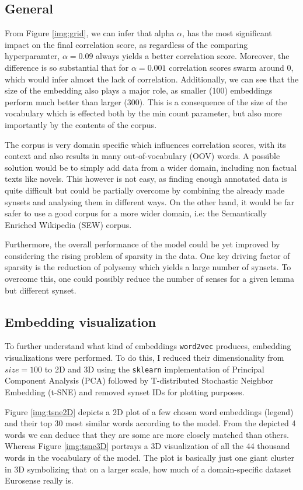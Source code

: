 \documentclass[12pt,a4paper]{article}
\begin{document}
\subsection{General}
From Figure \ref{img:grid}, we can infer that alpha $\alpha$, has the most significant impact on the final correlation score, as regardless of the comparing hyperparamter, $\alpha = 0.09$ always yields a better correlation score.  Moreover, the difference is so substantial that for $\alpha = 0.001$ correlation scores swarm around 0, which would infer almost the lack of correlation. Additionally, we can see that the size of the embedding also plays a major role, as smaller (100) embeddings perform much better than larger (300). This is a consequence of the size of the vocabulary which is effected both by the min count parameter, but also more importantly by the contents of the corpus. 

The corpus is very domain specific which influences correlation scores, with its context and also results in many out-of-vocabulary (OOV) words. A possible solution would be to simply add data from a wider domain, including non factual texts like novels. 
This however is not easy, as finding enough annotated data is quite difficult but could be partially overcome by combining the already made synsets and analysing them in different ways. On the other hand, it would be far safer to use  a good corpus for a more wider domain, i.e:  the Semantically Enriched Wikipedia (SEW) \cite{sew} corpus.

Furthermore, the overall performance of the model could be yet improved by considering the rising problem of sparsity in the data. One key driving factor of sparsity is the reduction of polysemy which yields a large number of synsets. To overcome this, one could possibly reduce the number of senses for a given lemma but different synset.

\subsection{Embedding visualization}
To further understand what kind of embeddings \texttt{word2vec} produces, embedding visualizations were performed. To do this, I reduced their dimensionality from $size = 100$ to 2D and 3D using the \texttt{sklearn} implementation of Principal Component Analysis (PCA) followed by T-distributed Stochastic Neighbor Embedding (t-SNE) and removed synset IDs  for plotting purposes.

Figure \ref{img:tsne2D} depicts a 2D plot of a few chosen word embeddings (legend) and their top 30 most similar words according to the model.  From the depicted 4 words we can deduce that they are some are more closely matched than others. Whereas Figure \ref{img:tsne3D} portrays a 3D visualization of all the 44 thousand words in the vocabulary of the model. The plot is basically just one giant cluster in 3D symbolizing that on a larger scale, how much of a domain-specific dataset Eurosense really is.
\end{document}
